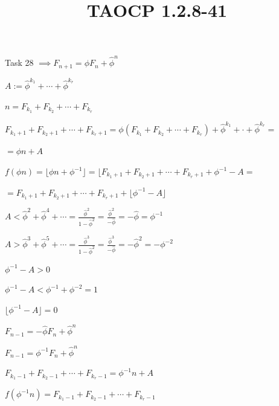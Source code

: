 \documentclass{article}
\title{TAOCP 1.2.8\mbox{-}41}
\begin{document}
\maketitle

Task 28 \( \implies F_{n+1} = \phi F_n + \hat\phi^n \)

\( A := \hat\phi^{k_1} + \cdots + \hat\phi^{k_r} \)

\( n = F_{k_1} + F_{k_2} + \cdots + F_{k_r} \)

\( F_{k_1+1} + F_{k_2+1} + \cdots + F_{k_r+1} = \phi(F_{k_1} + F_{k_2} + \cdots + F_{k_r}) + \hat\phi^{k_1} + \cdot + \hat\phi^{k_r} = \)

\( = \phi n + A \)

\( f(\phi n) = \lfloor \phi n + \phi^{-1} \rfloor = \lfloor F_{k_1+1} + F_{k_2+1} + \cdots + F_{k_r+1} + \phi^{-1} - A = \)

\( = F_{k_1+1} + F_{k_2+1} + \cdots + F_{k_r+1} + \lfloor \phi^{-1} - A \rfloor\)

\( A < \hat\phi^2 + \hat\phi^4 + \cdots = \frac{\hat\phi^2}{1-\hat\phi^2} = \frac{\hat\phi^2}{-\hat\phi} =  -\hat\phi = \phi^{-1} \)

\( A > \hat\phi^3 + \hat\phi^5 + \cdots = \frac{\hat\phi^3}{1-\hat\phi^2} = \frac{\hat\phi^3}{-\hat\phi} = -\hat\phi^{2} = - \phi^{-2} \)

\( \phi^{-1} - A > 0 \)

\( \phi^{-1} - A < \phi^{-1} + \phi^{-2} = 1 \)

\( \lfloor \phi^{-1} - A\rfloor = 0 \)

\( F_{n-1} = -\hat\phi F_n + \hat\phi^n \)

\( F_{n-1} = \phi^{-1} F_n + \hat\phi^n \)

\( F_{k_1-1} + F_{k_2-1} + \cdots + F_{k_r-1} = \phi^{-1} n + A \)

\( f(\phi^{-1} n) = F_{k_1-1} + F_{k_2-1} + \cdots + F_{k_r-1} \)
\end{document}

